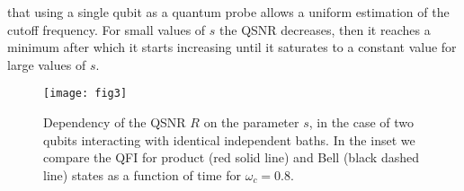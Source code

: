 \documentclass[ pra,a4paper,aps,twocolumn,superscriptaddress]{revtex4-1}
\def\tc#1{{\color{black}#1}}
\begin{document}
that using a single qubit as a quantum probe allows  a uniform estimation of the
cutoff frequency. 
\tc{For small values of $s$ the QSNR decreases, then it reaches a minimum after which it starts increasing until it saturates to a constant value for large values of $s$.}
\begin{figure}[t]
 \centering
   \texttt{[image: fig3]}
\caption{\label{fig3} Dependency of the QSNR $R$ on the parameter $s$, in the case of two qubits interacting with identical independent baths. \tc{In the inset we compare the QFI for product (red solid line) and Bell (black dashed line) states as a function of time for $\omega_c=0.8$}.}
 \end{figure}
\end{document}
